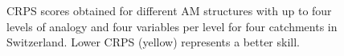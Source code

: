 \documentclass[draft]{agujournal2019}
\begin{document}
\begin{figure}[hbt]
	\noindent{}
	\caption{CRPS scores obtained for different AM structures with up to four levels of analogy and four variables per level for four catchments in Switzerland. Lower CRPS (yellow) represents a better skill.}
	\label{fig_structures_a}
\end{figure}
\end{document}
